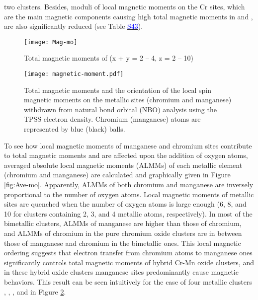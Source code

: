 \begin{refsection}
two clusters. Besides, moduli of local magnetic moments on the Cr sites, which are the main magnetic components causing high total magnetic moments in  and , are also significantly reduced (see Table \href{https://github.com/phamlenhan/PhDDissertation/blob/master/Chapter-8SI-Nhan-thesis-CrMnO.pdf}{\textcolor{blue}{S43}}\commenttext{\ref{SI:tab:localmaget}}). 


\begin{figure}[!htb]
	\centering
	\texttt{[image: Mag-mo]}
	\caption{Total magnetic moments of  (x + y = 2 – 4, z = 2 – 10)}
	\label{fig:Mag-mo}
\end{figure}

\begin{figure}[!htb]
	\centering
	\texttt{[image: magnetic-moment.pdf]}
	\caption{Total magnetic moments and the orientation of the local spin magnetic moments on the metallic sites (chromium and manganese) withdrawn from natural bond orbital (NBO) analysis using the TPSS electron density. Chromium (manganese) atoms are represented by blue (black) balls.}
	\label{fig:moment}
\end{figure}

\FloatBarrier

To see how local magnetic moments of manganese and chromium sites contribute to total magnetic moments and are affected upon the addition of oxygen atoms, averaged absolute local magnetic moments (ALMMs) of each metallic element (chromium and manganese) are calculated and graphically given in Figure \ref{fig:Ave-mo}. Apparently, ALMMs of both chromium and manganese are inversely proportional to the number of oxygen atoms. Local magnetic moments of metallic sites are quenched when the number of oxygen atoms is large enough (6, 8, and 10 for clusters containing 2, 3, and 4 metallic atoms, respectively). In most of the bimetallic clusters, ALMMs of manganese are higher than those of chromium, and ALMMs of chromium in the pure chromium oxide clusters are in between those of manganese and chromium in the bimetallic ones. This local magnetic ordering suggests that electron transfer from chromium atoms to manganese ones significantly controls total magnetic moments of hybrid Cr-Mn oxide clusters, and in these hybrid oxide clusters manganese sites predominantly cause magnetic behaviors. This result can be seen intuitively for the case of four metallic clusters , , , and  in Figure \ref{fig:moment}.


\end{refsection}
